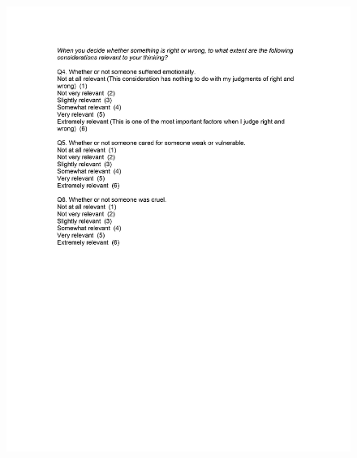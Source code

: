 \documentclass[12pt,econ]{sources/authesis}
\makeatletter
\def\maxwidth{\ifdim\Gin@nat@width>\linewidth\linewidth
\else\Gin@nat@width\fi}
\let\Oldincludegraphics\includegraphics
\renewcommand{\includegraphics}[1]{\Oldincludegraphics[width=\maxwidth]{#1}}
\makeatother
\begin{document}
\begin{figure}[hbt]
  \centering
\includegraphics{data/framing/appendix/questionnaire/questionnaire04.jpg}
\end{figure}
\end{document}
